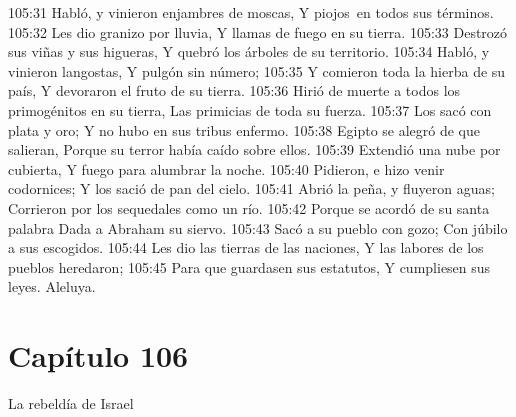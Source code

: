 105:31 Habló, y vinieron enjambres de moscas, 
Y piojos en todos sus términos. 
105:32 Les dio granizo por lluvia, 
Y llamas de fuego en su tierra. 
105:33 Destrozó sus viñas y sus higueras, 
Y quebró los árboles de su territorio. 
105:34 Habló, y vinieron langostas, 
Y pulgón sin número; 
105:35 Y comieron toda la hierba de su país, 
Y devoraron el fruto de su tierra. 
105:36 Hirió de muerte a todos los primogénitos en su tierra, 
Las primicias de toda su fuerza. 
105:37 Los sacó con plata y oro; 
Y no hubo en sus tribus enfermo. 
105:38 Egipto se alegró de que salieran, 
Porque su terror había caído sobre ellos. 
105:39 Extendió una nube por cubierta, 
Y fuego para alumbrar la noche. 
105:40 Pidieron, e hizo venir codornices; 
Y los sació de pan del cielo. 
105:41 Abrió la peña, y fluyeron aguas; 
Corrieron por los sequedales como un río. 
105:42 Porque se acordó de su santa palabra 
Dada a Abraham su siervo. 
105:43 Sacó a su pueblo con gozo; 
Con júbilo a sus escogidos. 
105:44 Les dio las tierras de las naciones, 
Y las labores de los pueblos heredaron; 
105:45 Para que guardasen sus estatutos, 
Y cumpliesen sus leyes. 
Aleluya. 
\section*{Capítulo 106}
La rebeldía de Israel 
 
